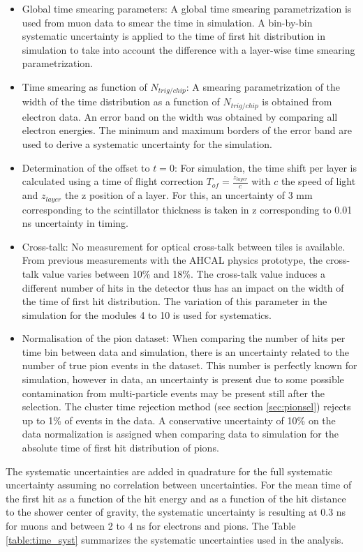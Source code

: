 \documentclass{JINST}
\begin{document}
\begin{itemize}
  \item Global time smearing parameters: A global time smearing parametrization is used from muon data to smear the time in simulation. A bin-by-bin systematic uncertainty is applied to the time of first hit distribution in simulation to take into account the difference with a layer-wise time smearing parametrization.
  \item Time smearing as function of $N_{trig/chip}$: A smearing parametrization of the width of the time distribution as a function of $N_{trig/chip}$ is obtained from electron data. An error band on the width was obtained by comparing all electron energies. The minimum and maximum borders of the error band are used to derive a systematic uncertainty for the simulation.
  \item Determination of the offset to $t=0$: For simulation, the time shift per layer is calculated using a time of flight correction $T_{of} = \frac{z_{layer}}{c}$ with $c$ the speed of light and $z_{layer}$ the z position of a layer. For this, an uncertainty of 3 mm corresponding to the scintillator thickness is taken in z corresponding to 0.01 ns uncertainty in timing.
  \item Cross-talk: No measurement for optical cross-talk between tiles is available. From previous measurements with the AHCAL physics prototype, the cross-talk value varies between 10\% and 18\%. The cross-talk value induces a different number of hits in the detector thus has an impact on the width of the time of first hit distribution. The variation of this parameter in the simulation for the modules 4 to 10 is used for systematics.
  \item Normalisation of the pion dataset: When comparing the number of hits per time bin between data and simulation, there is an uncertainty related to the number of true pion events in the dataset. This number is perfectly known for simulation, however in data, an uncertainty is present due to some possible contamination from multi-particle events may be present still after the selection. The cluster time rejection method (see section \ref{sec:pionsel}) rejects up to 1\% of events in the data. A conservative uncertainty of 10\% on the data normalization is assigned when comparing data to simulation for the absolute time of first hit distribution of pions.
\end{itemize}

The systematic uncertainties are added in quadrature for the full systematic uncertainty assuming no correlation between uncertainties. For the mean time of the first hit as a function of the hit energy and as a function of the hit distance to the shower center of gravity, the systematic uncertainty is resulting at 0.3 ns for muons and between 2 to 4 ns for electrons and pions. The Table \ref{table:time_syst} summarizes the systematic uncertainties used in the analysis.
\end{document}

